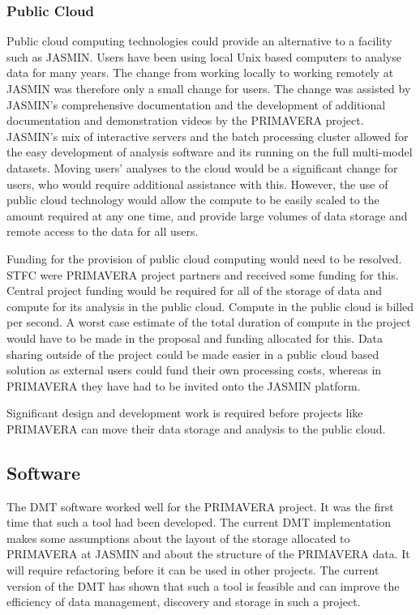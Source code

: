 \documentclass[gmd, manuscript]{copernicus}
\begin{document}
\subsubsection{Public Cloud}
Public cloud computing technologies could provide an alternative to a facility such as JASMIN. Users have been using local Unix based computers to analyse data for many years. The change from working locally to working remotely at JASMIN was therefore only a small change for users. The change was assisted by JASMIN's comprehensive documentation and the development of additional documentation and demonstration videos by the PRIMAVERA project. JASMIN's mix of interactive servers and the batch processing cluster allowed for the easy development of analysis software and its running on the full multi-model datasets. Moving users' analyses to the cloud would be a significant change for users, who would require additional assistance with this. However, the use of public cloud technology would allow the compute to be easily scaled to the amount required at any one time, and provide large volumes of data storage and remote access to the data for all users.

Funding for the provision of public cloud computing would need to be resolved. STFC were PRIMAVERA project partners and received some funding for this. Central project funding would be required for all of the storage of data and compute for its analysis in the public cloud. Compute in the public cloud is billed per second. A worst case estimate of the total duration of compute in the project would have to be made in the proposal and funding allocated for this. Data sharing outside of the project could be made easier in a public cloud based solution as external users could fund their own processing costs, whereas in PRIMAVERA they have had to be invited onto the JASMIN platform.

Significant design and development work is required before projects like PRIMAVERA can move their data storage and analysis to the public cloud.

\subsection{Software}

The DMT software worked well for the PRIMAVERA project. It was the first time that such a tool had been developed. The current DMT implementation makes some assumptions about the layout of the storage allocated to PRIMAVERA at JASMIN and about the structure of the PRIMAVERA data. It will require refactoring before it can be used in other projects. The current version of the DMT has shown that such a tool is feasible and can improve the efficiency of data management, discovery and storage in such a project.
\end{document}
